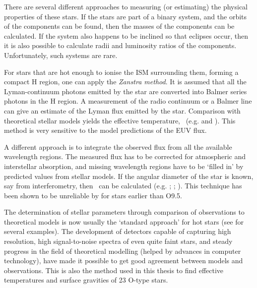 There are several different approaches to measuring (or estimating)
the physical properties of these stars. If the stars are part of a
binary system, and the orbits of the components can be found, then the
masses of the components can be calculated. If the system also happens
to be inclined so that eclipses occur, then it is also possible to
calculate radii and luminosity ratios of the
components. Unfortunately, such systems are rare.

For stars that are hot enough to ionise the ISM surrounding them,
forming a compact H region, one can apply the \emph{Zanstra
method}. It is assumed that all the Lyman-continuum photons emitted by
the star are converted into Balmer series photons in the H
region. A measurement of the radio continuum or a Balmer line can give
an estimate of the Lyman flux emitted by the star. Comparison with
theoretical stellar models yields the effective temperature, \teff\
(e.g. \cite{hj:68} and \cite{mo:69}). This method is very sensitive
to the model predictions of the EUV flux.

A different approach is to integrate the observed flux from all the
available wavelength regions. The measured flux has to be corrected
for atmospheric and interstellar absorption, and missing wavelength
regions have to be `filled in' by predicted values from stellar
models. If the angular diameter of the star is known, say from
interferometry, then \teff\ can be calculated (e.g. \cite{code:76};
\cite{un:79}; \cite{un:82}). This technique has been shown to be
unreliable by \ybcite{hu:88} for stars earlier than O9.5.

The determination of stellar parameters through comparison of
observations to theoretical models is now usually the `standard
approach' for hot stars (see \cite{ku:90} for several examples). The
development of detectors capable of capturing high resolution, high
signal-to-noise spectra of even quite faint stars, and steady progress
in the field of theoretical modelling (helped by advances in computer
technology), have made it possible to get good agreement between
models and observations. This is also the method used in this
thesis to find effective temperatures and surface gravities of 23
O-type stars. 



